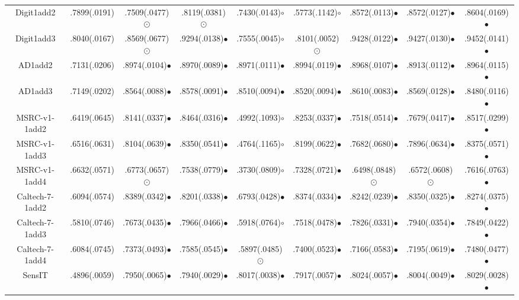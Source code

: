 \documentclass[10pt,journal,compsoc]{IEEEtran}
\begin{document}
\begin{table*}[!t]
{\begin{tabular}{c|| c c c c c c c c }
Digit1add2      & .7899(.0191) & .7509(.0477){\tiny $\odot$} & .8119(.0381){\tiny $\odot$} & .7430(.0143)$\circ$ & .5773(.1142)$\circ$ & .8572(.0113)$\bullet$  & .8572(.0127)$\bullet$  & .8604(.0169)$\bullet$  \\
Digit1add3      & .8040(.0167) & .8569(.0677){\tiny $\odot$} & .9294(.0138)$\bullet$ & .7555(.0045)$\circ$ & .8101(.0052){\tiny $\odot$} & .9428(.0122)$\bullet$ & .9427(.0130)$\bullet$ & .9452(.0141)$\bullet$ \\
AD1add2         & .7131(.0206) & .8974(.0104)$\bullet$ & .8970(.0089)$\bullet$ & .8971(.0111)$\bullet$ & .8994(.0119)$\bullet$ & .8968(.0107)$\bullet$ & .8913(.0112)$\bullet$ & .8964(.0115)$\bullet$\\
AD1add3         & .7149(.0202) & .8564(.0088)$\bullet$ & .8578(.0091)$\bullet$ & .8510(.0094)$\bullet$ & .8520(.0094)$\bullet$ & .8610(.0083)$\bullet$ & .8569(.0128)$\bullet$ & .8480(.0116)$\bullet$ \\
MSRC-v1-1add2   & .6419(.0645) & .8141(.0337)$\bullet$ & .8464(.0316)$\bullet$ & .4992(.1093)$\circ$ & .8253(.0337)$\bullet$ & .7518(.0514)$\bullet$ & .7679(.0417)$\bullet$ & .8517(.0299)$\bullet$ \\
MSRC-v1-1add3   & .6516(.0631) & .8104(.0639)$\bullet$ & .8350(.0541)$\bullet$ & .4764(.1165)$\circ$ & .8199(.0622)$\bullet$ & .7682(.0680)$\bullet$ & .7896(.0634)$\bullet$ & .8375(.0571)$\bullet$ \\
MSRC-v1-1add4   & .6632(.0571) & .6773(.0657){\tiny $\odot$} & .7538(.0779)$\bullet$ & .3730(.0809)$\circ$ & .7328(.0721)$\bullet$ & .6498(.0848){\tiny $\odot$} & .6572(.0608){\tiny $\odot$} & .7616(.0763)$\bullet$ \\
Caltech-7-1add2 &.6094(.0574) & .8389(.0342)$\bullet$ & .8201(.0338)$\bullet$ & .6793(.0428)$\bullet$ & .8374(.0334)$\bullet$ & .8242(.0239)$\bullet$ & .8350(.0325)$\bullet$ & .8274(.0375)$\bullet$ \\
Caltech-7-1add3 & .5810(.0746) & .7673(.0435)$\bullet$  & .7966(.0466)$\bullet$  & .5918(.0764)$\circ$ & .7518(.0478)$\bullet$  & .7826(.0331)$\bullet$  & .7940(.0354)$\bullet$  & .7849(.0422)$\bullet$  \\
Caltech-7-1add4 & .6084(.0745) & .7373(.0493)$\bullet$  & .7585(.0545)$\bullet$  & .5897(.0485){\tiny $\odot$} & .7400(.0523)$\bullet$ & .7166(.0583)$\bullet$ & .7195(.0619)$\bullet$ & .7480(.0477)$\bullet$ \\
\hline
\hline
SensIT          & .4896(.0059) & .7950(.0065)$\bullet$  & .7940(.0029)$\bullet$  & .8017(.0038)$\bullet$  & .7917(.0057)$\bullet$  & .8024(.0057)$\bullet$  & .8004(.0049)$\bullet$  & .8029(.0028)$\bullet$  \\

\end{tabular}}
\end{table*}
\end{document}
